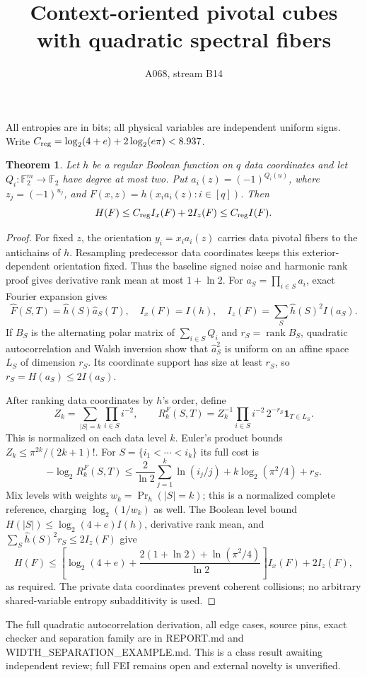 \documentclass{article}
\newtheorem{theorem}{Theorem}
\begin{document}
\title{Context-oriented pivotal cubes with quadratic spectral fibers}
\author{A068, stream B14}
\maketitle
All entropies are in bits; all physical variables are independent uniform signs.
Write $C_{\rm reg}=\log_2(4+e)+2\log_2(e\pi)<8.937$.
\begin{theorem}
Let $h$ be a regular Boolean function on $q$ data coordinates and let
$Q_i:\mathbb F_2^m\to\mathbb F_2$ have degree at most two. Put
$a_i(z)=(-1)^{Q_i(u)}$, where $z_j=(-1)^{u_j}$, and
$F(x,z)=h(x_i a_i(z):i\in[q])$. Then
\[
 H(F)\le C_{\rm reg} I_x(F)+2I_z(F)\le C_{\rm reg}I(F).
\]
\end{theorem}
\begin{proof}
For fixed $z$, the orientation $y_i=x_i a_i(z)$ carries data pivotal
fibers to the antichains of $h$. Resampling predecessor data coordinates
keeps this exterior-dependent orientation fixed. Thus the baseline signed
noise and harmonic rank proof gives derivative rank mean at most $1+\ln2$.
For $a_S=\prod_{i\in S}a_i$, exact Fourier expansion gives
\[
 \widehat F(S,T)=\widehat h(S)\widehat a_S(T),\quad
 I_x(F)=I(h),\quad I_z(F)=\sum_S\widehat h(S)^2 I(a_S).
\]
If $B_S$ is the alternating polar matrix of $\sum_{i\in S}Q_i$ and
$r_S=\operatorname{rank}B_S$, quadratic autocorrelation and Walsh inversion
show that $\widehat a_S^2$ is uniform on an affine space $L_S$ of dimension
$r_S$. Its coordinate support has size at least $r_S$, so
$r_S=H(a_S)\le2I(a_S)$.

After ranking data coordinates by $h$'s order, define
\[
 Z_k=\sum_{|S|=k}\prod_{i\in S}i^{-2},\qquad
 R_k^F(S,T)=Z_k^{-1}\prod_{i\in S}i^{-2}\,2^{-r_S}
                 \mathbf1_{T\in L_S}.
\]
This is normalized on each data level $k$. Euler's product bounds
$Z_k\le\pi^{2k}/(2k+1)!$. For $S=\{i_1<\cdots<i_k\}$ its full cost is
\[
 -\log_2 R_k^F(S,T)
 \le\frac2{\ln2}\sum_{j=1}^k\ln(i_j/j)
                  +k\log_2(\pi^2/4)+r_S.
\]
Mix levels with weights $w_k=\Pr_h(|S|=k)$; this is a normalized complete
reference, charging $\log_2(1/w_k)$ as well. The Boolean level bound
$H(|S|)\le\log_2(4+e)I(h)$, derivative rank mean, and
$\sum_S\widehat h(S)^2r_S\le2I_z(F)$ give
\[
 H(F)\le\left[\log_2(4+e)+
       \frac{2(1+\ln2)+\ln(\pi^2/4)}{\ln2}\right]I_x(F)+2I_z(F),
\]
as required. The private data coordinates prevent coherent collisions;
no arbitrary shared-variable entropy subadditivity is used.
\end{proof}
The full quadratic autocorrelation derivation, all edge cases, source pins,
exact checker and separation family are in REPORT.md and
WIDTH\_SEPARATION\_EXAMPLE.md. This is a class result awaiting independent
review; full FEI remains open and external novelty is unverified.
\end{document}
